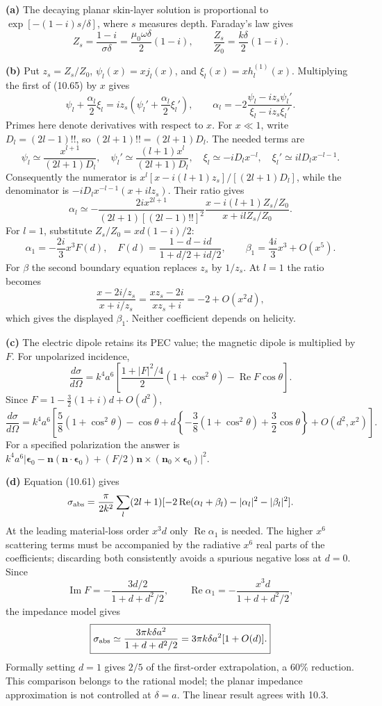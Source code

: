 \textbf{(a)} The decaying planar skin-layer solution is proportional to
$\exp[-(1-i)s/\delta]$, where $s$ measures depth. Faraday's law gives
\[
Z_s=\frac{1-i}{\sigma\delta}
=\frac{\mu_0\omega\delta}{2}(1-i),\qquad
\boxed{\frac{Z_s}{Z_0}=\frac{k\delta}{2}(1-i).}
\]

\textbf{(b)} Put $z_s=Z_s/Z_0$, $\psi_l(x)=xj_l(x)$, and
$\xi_l(x)=xh_l^{(1)}(x)$. Multiplying the first of (10.65) by $x$
gives
\[
\psi_l+\frac{\alpha_l}{2}\xi_l
=iz_s\left(\psi_l'+\frac{\alpha_l}{2}\xi_l'\right),\qquad
\alpha_l=-2\frac{\psi_l-iz_s\psi_l'}{\xi_l-iz_s\xi_l'}.
\]
Primes here denote derivatives with respect to $x$. For $x\ll1$,
write $D_l=(2l-1)!!$, so $(2l+1)!!=(2l+1)D_l$. The needed terms are
\[
\psi_l\simeq\frac{x^{l+1}}{(2l+1)D_l},\quad
\psi_l'\simeq\frac{(l+1)x^l}{(2l+1)D_l},\quad
\xi_l\simeq-iD_lx^{-l},\quad
\xi_l'\simeq ilD_lx^{-l-1}.
\]
Consequently the numerator is
$x^l[x-i(l+1)z_s]/[(2l+1)D_l]$, while the denominator is
$-iD_lx^{-l-1}(x+ilz_s)$. Their ratio gives
\[
\alpha_l\simeq-\frac{2ix^{2l+1}}
{(2l+1)[(2l-1)!!]^2}
\frac{x-i(l+1)Z_s/Z_0}{x+ilZ_s/Z_0}.
\]
For $l=1$, substitute $Z_s/Z_0=xd(1-i)/2$:
\[
\boxed{\alpha_1=-\frac{2i}{3}x^3 F(d),\quad
F(d)=\frac{1-d-id}{1+d/2+id/2},\qquad
\beta_1=\frac{4i}{3}x^3+O(x^5).}
\]
For $\beta$ the second boundary equation replaces $z_s$ by $1/z_s$.
At $l=1$ the ratio becomes
\[
\frac{x-2i/z_s}{x+i/z_s}
=\frac{xz_s-2i}{xz_s+i}=-2+O(x^2d),
\]
which gives the displayed $\beta_1$. Neither coefficient depends on
helicity.

\textbf{(c)} The electric dipole retains its PEC value; the magnetic
dipole is multiplied by $F$. For unpolarized incidence,
\[
\frac{d\sigma}{d\Omega}
=k^4a^6\left[\frac{1+|F|^2/4}{2}(1+\cos^2\theta)
-\operatorname{Re}F\cos\theta\right].
\]
Since $F=1-\tfrac32(1+i)d+O(d^2)$,
\[
\boxed{\frac{d\sigma}{d\Omega}=k^4a^6
\left[\frac58(1+\cos^2\theta)-\cos\theta
+d\left\{-\frac38(1+\cos^2\theta)+\frac32\cos\theta\right\}
+O(d^2,x^2)\right].}
\]
For a specified polarization the answer is
$k^4a^6|\boldsymbol\epsilon_0-\mathbf n(\mathbf n\cdot
\boldsymbol\epsilon_0)+(F/2)\mathbf n\times
(\mathbf n_0\times\boldsymbol\epsilon_0)|^2$.

\textbf{(d)} Equation (10.61) gives
\[
\sigma_{\rm abs}=\frac{\pi}{2k^2}\sum_l(2l+1)
[-2\operatorname{Re}(\alpha_l+\beta_l)-|\alpha_l|^2-|\beta_l|^2].
\]
At the leading material-loss order $x^3d$ only
$\operatorname{Re}\alpha_1$ is needed. The higher $x^6$ scattering terms
must be accompanied by the radiative $x^6$ real parts of the coefficients;
discarding both consistently avoids a spurious negative loss at $d=0$.
Since
\[
\operatorname{Im}F=-\frac{3d/2}{1+d+d^2/2},\qquad
\operatorname{Re}\alpha_1=-\frac{x^3d}{1+d+d^2/2},
\]
the impedance model gives
\[
\boxed{\sigma_{\rm abs}\simeq
\frac{3\pi k\delta a^2}{1+d+d^2/2}
=3\pi k\delta a^2[1+O(d)].}
\]
Formally setting $d=1$ gives $2/5$ of the first-order extrapolation,
a $60\%$ reduction. This comparison belongs to the rational model;
the planar impedance approximation is not controlled at $\delta=a$.
The linear result agrees with 10.3.

